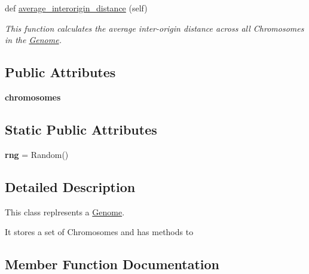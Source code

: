 \begin{DoxyCompactItemize}
def \mbox{\hyperlink{classReDyMo_1_1src_1_1genome_1_1Genome_a1c933cf2a91ad7dddeed4bc940c47ad2}{average\+\_\+interorigin\+\_\+distance}} (self)
\begin{DoxyCompactList}\small\item\em This function calculates the average inter-\/origin distance across all Chromosomes in the \mbox{\hyperlink{classReDyMo_1_1src_1_1genome_1_1Genome}{Genome}}. \end{DoxyCompactList}\end{DoxyCompactItemize}
\subsection*{Public Attributes}
\begin{DoxyCompactItemize}
\item 
\mbox{\label{classReDyMo_1_1src_1_1genome_1_1Genome_a90aa6bae9a3b2eeb3c9f63dd52e17ca6}} 
{\bfseries chromosomes}
\end{DoxyCompactItemize}
\subsection*{Static Public Attributes}
\begin{DoxyCompactItemize}
\item 
\mbox{\label{classReDyMo_1_1src_1_1genome_1_1Genome_a08e3ad3e0d245d003407891178177ad5}} 
{\bfseries rng} = Random()
\end{DoxyCompactItemize}


\subsection{Detailed Description}
This class replresents a \mbox{\hyperlink{classReDyMo_1_1src_1_1genome_1_1Genome}{Genome}}. 

It stores a set of Chromosomes and has methods to 

\subsection{Member Function Documentation}
\mbox{\label{classReDyMo_1_1src_1_1genome_1_1Genome_a1c933cf2a91ad7dddeed4bc940c47ad2}} 
